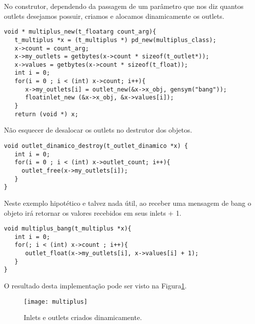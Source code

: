 No construtor, dependendo da passagem de um parâmetro que nos diz quantos outlets
desejamos possuir, criamos e alocamos dinamicamente os outlets.

\begin{lstlisting}[caption=Criação dinâmica de inlets e outlets]
void * multiplus_new(t_floatarg count_arg){
   t_multiplus *x = (t_multiplus *) pd_new(multiplus_class);
   x->count = count_arg;
   x->my_outlets = getbytes(x->count * sizeof(t_outlet*));
   x->values = getbytes(x->count * sizeof(t_float));
   int i = 0;
   for(i = 0 ; i < (int) x->count; i++){
      x->my_outlets[i] = outlet_new(&x->x_obj, gensym("bang"));
      floatinlet_new (&x->x_obj, &x->values[i]);
   }
   return (void *) x;
\end{lstlisting}

Não esquecer de desalocar os outlets no destrutor dos objetos.

\begin{lstlisting}[caption=Destrutor com outlets dinâmicos]
void outlet_dinamico_destroy(t_outlet_dinamico *x) {
   int i = 0;
   for(i = 0 ; i < (int) x->outlet_count; i++){
     outlet_free(x->my_outlets[i]);
   }
}
\end{lstlisting}

Neste exemplo hipotético e talvez nada útil, ao receber uma mensagem de bang
o objeto irá retornar os valores recebidos em seus inlets + 1.

\begin{lstlisting}[caption=Destrutor com outlets dinâmicos]
void multiplus_bang(t_multiplus *x){
   int i = 0;
   for(; i < (int) x->count ; i++){
      outlet_float(x->my_outlets[i], x->values[i] + 1);
   }
}
\end{lstlisting}

O resultado desta implementação pode ser visto na Figura\ref{fig:multiplus}.

\begin{figure}[h!]
\centering
\texttt{[image: multiplus]}
\caption{Inlets e outlets criados dinamicamente.}
\label{fig:multiplus}
\end{figure}

